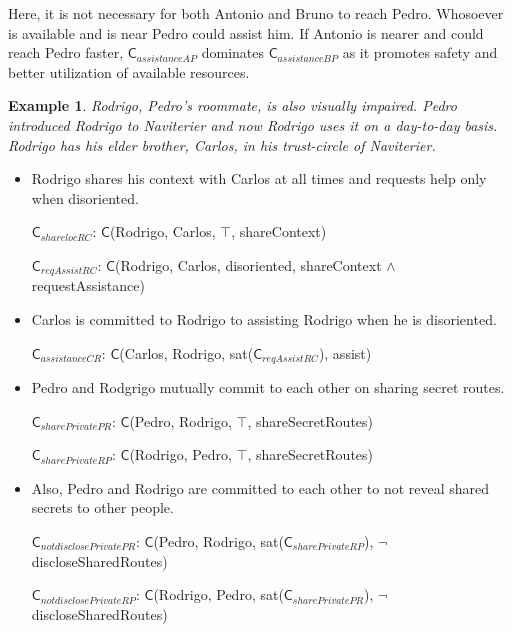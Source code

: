 \documentclass[11pt,          %
               phd,           %
               onehalfspacing %
               ]{ncsuthesis}
\newtheorem{example}{Example}
\newcommand{\msf}{\mathsf}
\newcommand{\C}{\msf{C}}
\newcommand{\navigationapp}{Naviterier\xspace}
\newcommand{\nsa}[1]{\textcolor{green!50!black}{NSA:~~#1}}
\newcommand{\mps}[1]{\textcolor{blue}{MPS:~~#1}}
\begin{document}

Here, it is not necessary for both Antonio and Bruno to reach Pedro.
Whosoever is available and is near Pedro could assist him. If Antonio
is nearer and could reach Pedro faster, $\C_{assistanceAP}$ dominates
$\C_{assistanceBP}$ as it promotes safety and better utilization of
available resources.

\begin{example}
Rodrigo, Pedro's roommate, is also visually impaired. Pedro introduced
Rodrigo to \navigationapp and now Rodrigo uses it on a day-to-day
basis. Rodrigo has his elder brother, Carlos, in his trust-circle of
\navigationapp.
\end{example}

\begin{itemize}

\item Rodrigo shares his context with Carlos at all times and requests
help only when disoriented.

$\C_{sharelocRC}$: 
$\C$(Rodrigo, Carlos, $\top$, shareContext)

$\C_{reqAssistRC}$: 
$\C$(Rodrigo, Carlos, disoriented, shareContext $\land$ requestAssistance)

\item Carlos is committed to Rodrigo to assisting Rodrigo when he is disoriented.

$\C_{assistanceCR}$: $\C$(Carlos, Rodrigo, sat($\C_{reqAssistRC}$), assist)

\item Pedro and Rodgrigo mutually commit to each other on sharing secret routes. 

$\C_{sharePrivatePR}$: $\C$(Pedro, Rodrigo, $\top$, shareSecretRoutes)

$\C_{sharePrivateRP}$: $\C$(Rodrigo, Pedro, $\top$, shareSecretRoutes)

\item Also, Pedro and Rodrigo are committed to each other to not reveal shared secrets to other people. 

$\C_{notdisclosePrivatePR}$: $\C$(Pedro, Rodrigo, sat($\C_{sharePrivateRP}$), $\neg$ discloseSharedRoutes)

$\C_{notdisclosePrivateRP}$: $\C$(Rodrigo, Pedro, sat($\C_{sharePrivatePR}$), $\neg$ discloseSharedRoutes)
\end{itemize}
\end{document}
